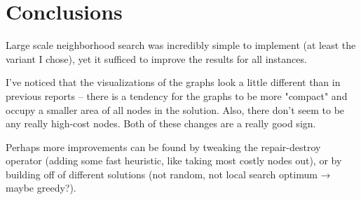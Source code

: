 \documentclass[14pt]{article}
\begin{document}
\section{Conclusions}
Large scale neighborhood search was incredibly simple to implement (at least
the variant I chose), yet it sufficed to improve the results for all instances.

I've noticed that the visualizations of the graphs look a little different than in
previous reports -- there is a tendency for the graphs to be more "compact" and
occupy a smaller area of all nodes in the solution. Also, there don't seem to
be any really high-cost nodes. Both of these changes are a really good sign.


Perhaps more improvements can be found by tweaking the repair-destroy operator
(adding some fast heuristic, like taking most costly nodes out), or by building
off of different solutions (not random, not local search optimum → maybe
greedy?).
\end{document}
